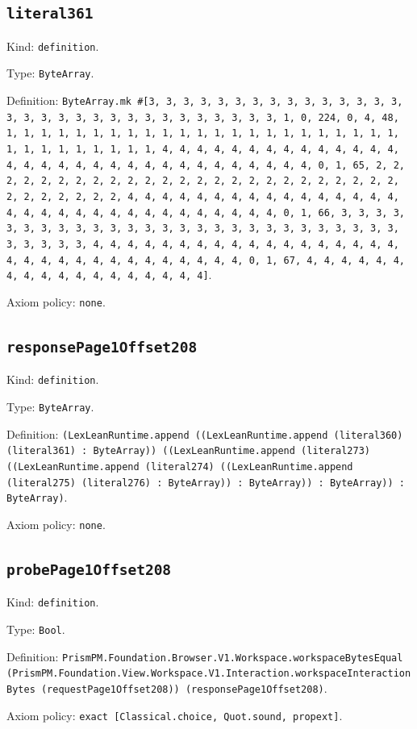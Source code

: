 \documentclass[11pt]{article}
\begin{document}
\subsection*{\texttt{literal361}}
\noindent Kind: \texttt{definition}.\par
\noindent Type: \texttt{ByteArray}.\par
\noindent Definition: \texttt{ByteArray.mk \#[3, 3, 3, 3, 3, 3, 3, 3, 3, 3, 3, 3, 3, 3, 3, 3, 3, 3, 3, 3, 3, 3, 3, 3, 3, 3, 3, 3, 3, 3, 3, 1, 0, 224, 0, 4, 48, 1, 1, 1, 1, 1, 1, 1, 1, 1, 1, 1, 1, 1, 1, 1, 1, 1, 1, 1, 1, 1, 1, 1, 1, 1, 1, 1, 1, 1, 1, 1, 1, 4, 4, 4, 4, 4, 4, 4, 4, 4, 4, 4, 4, 4, 4, 4, 4, 4, 4, 4, 4, 4, 4, 4, 4, 4, 4, 4, 4, 4, 4, 4, 4, 0, 1, 65, 2, 2, 2, 2, 2, 2, 2, 2, 2, 2, 2, 2, 2, 2, 2, 2, 2, 2, 2, 2, 2, 2, 2, 2, 2, 2, 2, 2, 2, 2, 2, 2, 4, 4, 4, 4, 4, 4, 4, 4, 4, 4, 4, 4, 4, 4, 4, 4, 4, 4, 4, 4, 4, 4, 4, 4, 4, 4, 4, 4, 4, 4, 4, 4, 0, 1, 66, 3, 3, 3, 3, 3, 3, 3, 3, 3, 3, 3, 3, 3, 3, 3, 3, 3, 3, 3, 3, 3, 3, 3, 3, 3, 3, 3, 3, 3, 3, 3, 3, 4, 4, 4, 4, 4, 4, 4, 4, 4, 4, 4, 4, 4, 4, 4, 4, 4, 4, 4, 4, 4, 4, 4, 4, 4, 4, 4, 4, 4, 4, 4, 4, 0, 1, 67, 4, 4, 4, 4, 4, 4, 4, 4, 4, 4, 4, 4, 4, 4, 4, 4, 4, 4]}.\par
\noindent Axiom policy: \texttt{none}.\par
\subsection*{\texttt{responsePage1Offset208}}
\noindent Kind: \texttt{definition}.\par
\noindent Type: \texttt{ByteArray}.\par
\noindent Definition: \texttt{(LexLeanRuntime.append ((LexLeanRuntime.append (literal360) (literal361) : ByteArray)) ((LexLeanRuntime.append (literal273) ((LexLeanRuntime.append (literal274) ((LexLeanRuntime.append (literal275) (literal276) : ByteArray)) : ByteArray)) : ByteArray)) : ByteArray)}.\par
\noindent Axiom policy: \texttt{none}.\par
\subsection*{\texttt{probePage1Offset208}}
\noindent Kind: \texttt{definition}.\par
\noindent Type: \texttt{Bool}.\par
\noindent Definition: \texttt{PrismPM.Foundation.Browser.V1.Workspace.workspaceBytesEqual (PrismPM.Foundation.View.Workspace.V1.Interaction.workspaceInteractionBytes (requestPage1Offset208)) (responsePage1Offset208)}.\par
\noindent Axiom policy: \texttt{exact [Classical.choice, Quot.sound, propext]}.\par
\end{document}
